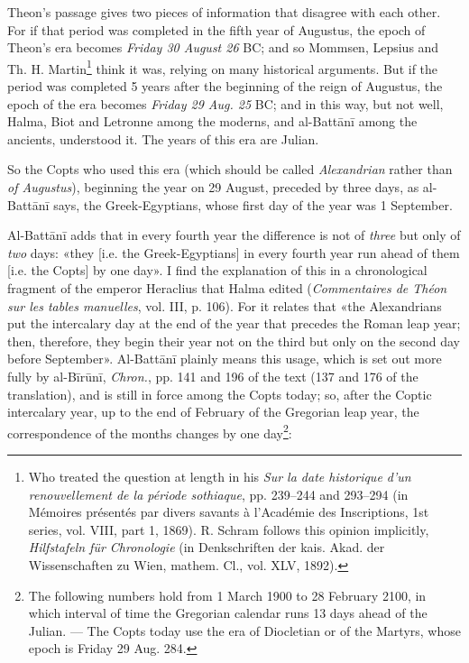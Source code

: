 \documentclass[11pt]{article}
\newcommand{\Pg}[1]{\marginpar{\footnotesize\color{gray}#1}}
\begin{document}
\par Theon's passage gives two pieces of information that disagree with each other. For if that period was completed in the fifth year of Augustus, the epoch of Theon's era becomes \emph{Friday 30 August 26} BC; and so Mommsen, Lepsius and Th. H. Martin\footnote{Who treated the question at length in his \emph{Sur la date historique d’un renouvellement de la période sothiaque}, pp. 239–244 and 293–294 (in Mémoires présentés par divers savants à l’Académie des Inscriptions, 1st series, vol. VIII, part 1, 1869). R. Schram follows this opinion implicitly, \emph{Hilfstafeln für Chronologie} (in Denkschriften der kais. Akad. der Wissenschaften zu Wien, mathem. Cl., vol. XLV, 1892).} think it was, relying on many historical arguments. But if the period was completed 5 years after the beginning of the reign of Augustus, the epoch of the era becomes \emph{Friday 29 Aug. 25} BC; and in this way, but not well, Halma, Biot and Letronne among the moderns, and al-Battānī among the ancients, understood it. The years of this era are Julian.\par
\par So the Copts who used this era (which should be called \emph{Alexandrian} rather than \emph{of Augustus}), beginning the year on 29 August, preceded by three days, as al-Battānī says, the Greek-Egyptians, whose first day of the year was 1 September.\par
\par \Pg{I 245}Al-Battānī adds that in every fourth year the difference is not of \emph{three} but only of \emph{two} days: «they [i.e. the Greek-Egyptians] in every fourth year run ahead of them [i.e. the Copts] by one day». I find the explanation of this in a chronological fragment of the emperor Heraclius that Halma edited (\emph{Commentaires de Théon sur les tables manuelles}, vol. III, p. 106). For it relates that «the Alexandrians put the intercalary day at the end of the year that precedes the Roman leap year; then, therefore, they begin their year not on the third but only on the second day before September». Al-Battānī plainly means this usage, which is set out more fully by al-Bīrūnī, \emph{Chron.}, pp. 141 and 196 of the text (137 and 176 of the translation), and is still in force among the Copts today; so, after the Coptic intercalary year, up to the end of February of the Gregorian leap year, the correspondence of the months changes by one day\footnote{The following numbers hold from 1 March 1900 to 28 February 2100, in which interval of time the Gregorian calendar runs 13 days ahead of the Julian. — The Copts today use the era of Diocletian or of the Martyrs, whose epoch is Friday 29 Aug. 284.}:\par
\end{document}

